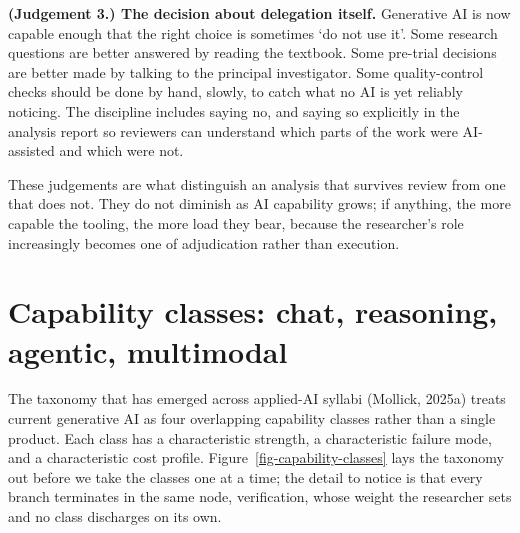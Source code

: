 \documentclass[
  letterpaper,
  11pt]{scrbook}
\begin{document}
\textbf{(Judgement 3.) The decision about delegation itself.} Generative
AI is now capable enough that the right choice is sometimes `do not use
it'. Some research questions are better answered by reading the
textbook. Some pre-trial decisions are better made by talking to the
principal investigator. Some quality-control checks should be done by
hand, slowly, to catch what no AI is yet reliably noticing. The
discipline includes saying no, and saying so explicitly in the analysis
report so reviewers can understand which parts of the work were
AI-assisted and which were not.

These judgements are what distinguish an analysis that survives review
from one that does not. They do not diminish as AI capability grows; if
anything, the more capable the tooling, the more load they bear, because
the researcher's role increasingly becomes one of adjudication rather
than execution.

\section{Capability classes: chat, reasoning, agentic,
multimodal}\label{capability-classes-chat-reasoning-agentic-multimodal}

The taxonomy that has emerged across applied-AI syllabi (Mollick, 2025a)
treats current generative AI as four overlapping capability classes
rather than a single product. Each class has a characteristic strength,
a characteristic failure mode, and a characteristic cost profile.
Figure~\ref{fig-capability-classes} lays the taxonomy out before we take
the classes one at a time; the detail to notice is that every branch
terminates in the same node, verification, whose weight the researcher
sets and no class discharges on its own.
\end{document}
